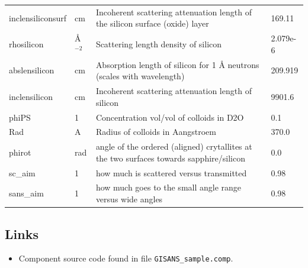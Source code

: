 \begin{longtable}{p{}p{}p{}p{}}
inclensiliconsurf & cm & Incoherent scattering attenuation length of the silicon surface (oxide) layer & 169.11 \\
rhosilicon & \AA{}$^{-2}$ & Scattering length density of silicon & 2.079e-6 \\
abslensilicon & cm & Absorption length of silicon for 1 \AA{} neutrons (scales with wavelength) & 209.919 \\
inclensilicon & cm & Incoherent scattering attenuation length of silicon & 9901.6 \\
phiPS & 1 & Concentration vol/vol of colloids in D2O & 0.1 \\
Rad & A & Radius of colloids in Aangstroem & 370.0 \\
phirot & rad & angle of the ordered (aligned) crytallites at the two surfaces towards sapphire/silicon & 0.0 \\
sc\_aim & 1 & how much is scattered versus transmitted & 0.98 \\
sans\_aim & 1 & how much goes to the small angle range versus wide angles & 0.98 \\
\bottomrule
\end{longtable}

\subsection*{Links}
\begin{itemize}
  \item Component source code found in file \texttt{GISANS\_sample.comp}.
\end{itemize}
